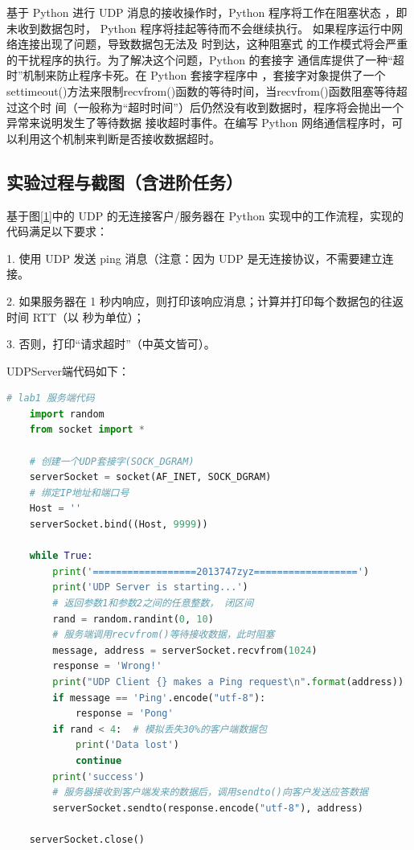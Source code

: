 \documentclass[a4paper,12pt]{report}
\begin{document}
\begin{spacing}{1.5}
基于 Python 进行 UDP 消息的接收操作时，Python 程序将工作在阻塞状态
，即未收到数据包时， Python 程序将挂起等待而不会继续执行。
如果程序运行中网络连接出现了问题，导致数据包无法及 时到达，这种阻塞式
的工作模式将会严重的干扰程序的执行。为了解决这个问题，Python 的套接字 
通信库提供了一种“超时”机制来防止程序卡死。在 Python 套接字程序中
，套接字对象提供了一个settimeout()方法来限制recvfrom()函数的等待时间，当recvfrom()函数阻塞等待超过这个时 间（一般称为“超时时间”）后仍然没有收到数据时，程序将会抛出一个异常来说明发生了等待数据 接收超时事件。在编写 Python 网络通信程序时，可以利用这个机制来判断是否接收数据超时。

\subsection{实验过程与截图（含进阶任务）}
基于图\ref{1}中的 UDP 的无连接客户/服务器在 Python 实现中的工作流程，实现的代码满足以下要求：

1. 使用 UDP 发送 ping 消息（注意：因为 UDP 是无连接协议，不需要建立连接。

2. 如果服务器在 1 秒内响应，则打印该响应消息；计算并打印每个数据包的往返时间 RTT（以 秒为单位）；

3. 否则，打印“请求超时”（中英文皆可）。

UDPServer端代码如下：
\begin{spacing}{1}  
	\begin{lstlisting}[language={Python}]
    # lab1 服务端代码
    import random
    from socket import *
    
    # 创建一个UDP套接字(SOCK_DGRAM)
    serverSocket = socket(AF_INET, SOCK_DGRAM)
    # 绑定IP地址和端口号
    Host = ''
    serverSocket.bind((Host, 9999))
    
    while True:
        print('==================2013747zyz==================')
        print('UDP Server is starting...')
        # 返回参数1和参数2之间的任意整数， 闭区间
        rand = random.randint(0, 10)
        # 服务端调用recvfrom()等待接收数据，此时阻塞
        message, address = serverSocket.recvfrom(1024)
        response = 'Wrong!'
        print("UDP Client {} makes a Ping request\n".format(address))
        if message == 'Ping'.encode("utf-8"):
            response = 'Pong'
        if rand < 4:  # 模拟丢失30%的客户端数据包
            print('Data lost')
            continue
        print('success')
        # 服务器接收到客户端发来的数据后，调用sendto()向客户发送应答数据
        serverSocket.sendto(response.encode("utf-8"), address)
    
    serverSocket.close()
    

\end{lstlisting}
\end{spacing}
\end{spacing}
\end{document}
